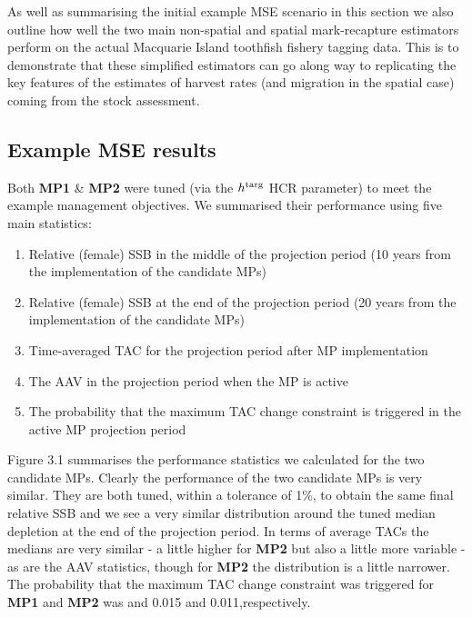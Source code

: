 \documentclass[12pt,a4paper,twoside,times,sky,standard]{csiroreport2017}
\begin{document}
As well as summarising the initial example MSE scenario in this section we also outline how well the two main non-spatial and spatial mark-recapture estimators perform on the actual Macquarie Island toothfish fishery tagging data. This is to demonstrate that these simplified estimators can go along way to replicating the key features of the estimates of harvest rates (and migration in the spatial case) coming from the stock assessment. 

\subsection{Example MSE results}

Both \textbf{MP1} \& \textbf{MP2} were tuned (via the $h^{\rm targ}$ HCR parameter) to meet the example management objectives. We summarised their performance using five main statistics:

\begin{enumerate}
    \item Relative (female) SSB in the middle of the projection period (10 years from the implementation of the candidate MPs)
    \item Relative (female) SSB at the end of the projection period (20 years from the implementation of the candidate MPs)
    \item Time-averaged TAC for the projection period after MP implementation
    \item The AAV in the projection period when the MP is active
    \item The probability that the maximum TAC change constraint is triggered in the active MP projection period
\end{enumerate}

Figure 3.1 summarises the performance statistics we calculated for the two candidate MPs. Clearly the performance of the two candidate MPs is very similar. They are both tuned, within a tolerance of 1\%, to obtain the same final relative SSB and we see a very similar distribution around the tuned median depletion at the end of the projection period. In terms of average TACs the medians are very similar - a little higher for \textbf{MP2} but also a little more variable - as are the AAV statistics, though for \textbf{MP2} the distribution is a little narrower. The probability that the maximum TAC change constraint was triggered for \textbf{MP1} and \textbf{MP2} was and 0.015 and 0.011,respectively.
\end{document}
